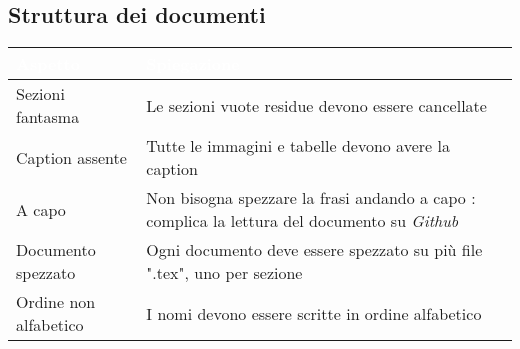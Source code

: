 \subsection{Struttura dei documenti}
{
    \setlength{\freewidth}{\dimexpr\textwidth-10\tabcolsep}
    \renewcommand{\arraystretch}{1.5}
    \centering
    \setlength{\aboverulesep}{0pt}
    \setlength{\belowrulesep}{0pt}
    \begin{longtable}{C{.5\freewidth} C{.5\freewidth}}
       \toprule
    \textcolor{white}{\textbf{Aspetto}}&
    \textcolor{white}{\textbf{Spiegazione}} \\
    \toprule
    \endhead
    Sezioni fantasma & Le sezioni vuote residue devono essere cancellate \\
    Caption assente &  Tutte le immagini e tabelle devono avere la caption \\
    A capo & Non bisogna spezzare la frasi andando a capo : complica la lettura del documento su \textit{Github}\\
    Documento spezzato & Ogni documento deve essere spezzato su più file ".tex", uno per sezione \\
    Ordine non alfabetico & I nomi devono essere scritte in ordine alfabetico \\
    
    \bottomrule
\end{longtable}    
    
}
